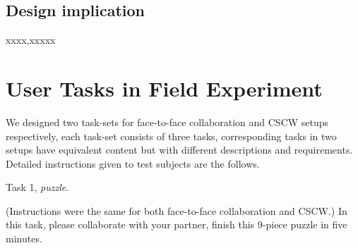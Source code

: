 \documentclass[12pt,twoside]{article}
\begin{document}
\subsection{Design implication}
xxxx,xxxxx




\appendix
\section{User Tasks in Field Experiment}
\label{appdx:user tasks}

We designed two task-sets for face-to-face collaboration and CSCW setups respectively, each task-set consists of three tasks, corresponding tasks in two setups have equivalent content but with different descriptions and requirements. Detailed instructions given to test subjects are the follows.

Task 1, \textit{puzzle}.

(Instructions were the same for both face-to-face collaboration and CSCW.) In this task, please collaborate with your partner, finish this 9-piece puzzle in five minutes.
\end{document}
